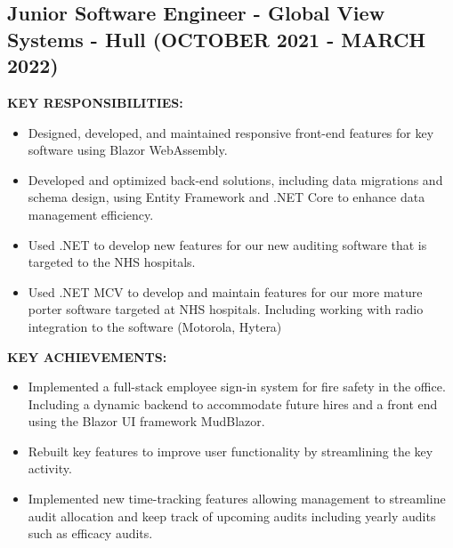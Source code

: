 \documentclass{article}
\begin{document}
\subsection{Junior Software Engineer - \textnormal{Global View Systems - Hull} \footnotesize{(OCTOBER 2021 - MARCH 2022)}}
\begin{minipage}[t]{1\textwidth}
    \footnotesize{\textbf{KEY RESPONSIBILITIES:}}
    \normalsize{}
    \begin{itemize}[leftmargin=*]
        \item Designed, developed, and maintained responsive front-end features for key software using Blazor WebAssembly.
        \item Developed and optimized back-end solutions, including data migrations and schema design, using Entity Framework and .NET Core to enhance data management efficiency.
        \item Used .NET to develop new features for our new auditing software that is targeted to the NHS hospitals.
        \item Used .NET MCV to develop and maintain features for our more mature porter software targeted at NHS hospitals. Including working with radio integration to the software (Motorola, Hytera)    
    \end{itemize}
\end{minipage}
\begin{minipage}[t]{1\textwidth}
    \vspace{1em}
    \footnotesize{\textbf{KEY ACHIEVEMENTS:}}
    \normalsize{}
    \begin{itemize}[leftmargin=*]
        \item Implemented a full-stack employee sign-in system for fire safety in the office. Including a dynamic backend to accommodate future hires and a front end using the Blazor UI framework MudBlazor.
        \item Rebuilt key features to improve user functionality by streamlining the key activity.
        \item Implemented new time-tracking features allowing management to streamline audit allocation and keep track of upcoming audits including yearly audits such as efficacy audits.
    \end{itemize}
\end{minipage}
\end{document}
